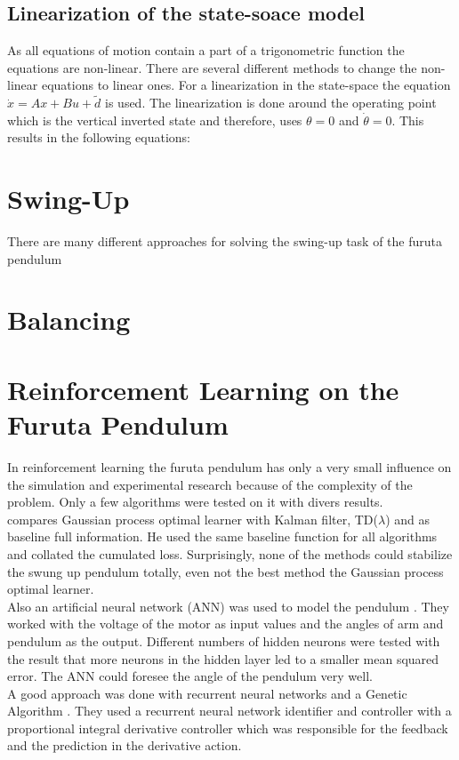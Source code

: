 \subsection{Linearization of the state-soace model}
As all equations of motion contain a part of a trigonometric function the 
equations are non-linear. There are several different methods to change the 
non-linear equations to linear ones. %
 For a linearization in the state-space the equation 
$\dot{x}=Ax+Bu+\tilde{d}$ is used. The linearization is done around the 
operating point \cite{rigatos2018nonlinear} which is the vertical inverted 
state and therefore, uses $\theta = 0$ and $\dot{\theta}=0$. This results in 
the following equations:

\section{Swing-Up}
There are many different approaches for solving the swing-up task of the furuta 
pendulum
\section{Balancing}

\section{Reinforcement Learning on the Furuta Pendulum}
In reinforcement learning the furuta pendulum has only a very small influence 
on the simulation and experimental research because of the complexity of the 
problem. Only a few algorithms were tested on it with divers results.\\
\citeauthor{hennig2011optimal} compares Gaussian process optimal learner with 
Kalman filter, TD($\lambda$) and as baseline full information. He used the same 
baseline function for all algorithms and collated the cumulated loss. 
Surprisingly, none of the methods could stabilize the swung up pendulum 
totally, even not the best method the Gaussian process optimal learner.\\
Also an artificial neural network (ANN) was used to model the pendulum 
\cite{quyen2012rotary}. They worked with the voltage of the motor as input 
values and the angles of arm and pendulum as the output. Different numbers of 
hidden neurons were tested with the result that more neurons in the hidden 
layer led to a smaller mean squared error. The ANN could foresee the angle of 
the pendulum very well.\\
A good approach was done with recurrent neural networks and a Genetic Algorithm 
\cite{shojaei2011hybrid}. They used a recurrent neural network identifier and 
controller with a proportional integral derivative controller which was 
responsible for the feedback and the prediction in the derivative action.






